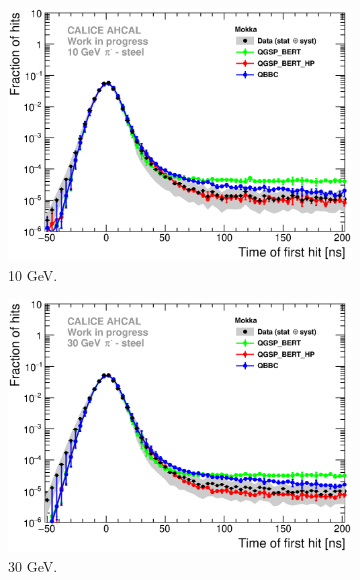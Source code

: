 \begin{figure}[htbp!]
  \begin{subfigure}[t]{0.49\textwidth}
    \centering
    \includegraphics[width=1\textwidth]{../Thesis_Plots/Timing/Pions/Plots/ComparisonToSim/Comparison_SimData_Pion10GeV_LateClusters.eps}
    \caption{10 GeV.} \label{fig:dNdt_SimData_10GeV}
  \end{subfigure}
  \hfill
  \begin{subfigure}[t]{0.49\textwidth}
    \centering
    \includegraphics[width=1\textwidth]{../Thesis_Plots/Timing/Pions/Plots/ComparisonToSim/Comparison_SimData_Pion30GeV_LateClusters.eps}
    \caption{30 GeV.}\label{fig:dNdt_SimData_30GeV}
  \end{subfigure}
  \hfill
  \begin{subfigure}[t]{0.49\textwidth}

\end{subfigure}
\end{figure}
